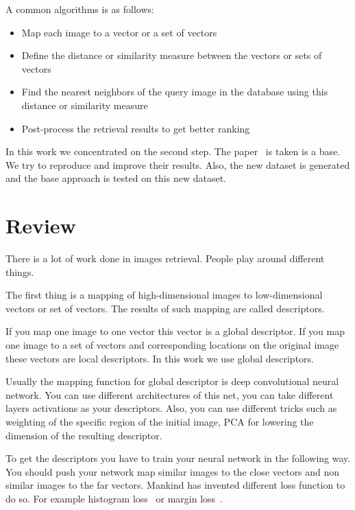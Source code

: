 \documentclass[a4paper,12pt]{extreport}
\begin{document}
    A common algorithms is as follows:
    \begin{itemize}
        \item {Map each image to a vector or a set of vectors}
        \item {Define the distance or similarity measure between the vectors or sets of vectors}
        \item {Find the nearest neighbors of the query image in the database using this distance or similarity measure}
        \item {Post-process the retrieval results to get better ranking}
    \end{itemize}

    In this work we concentrated on the second step. The paper~\cite{original_paper} is taken is a base.
    We try to reproduce and improve their results.
    Also, the new dataset is generated and the base approach is tested on this new dataset.
    \newline

    \chapter{Review}\label{ch:review}

    There is a lot of work done in images retrieval. People play around different things.
    \newline

    The first thing is a mapping of high-dimensional images to low-dimensional vectors or set of vectors.
    The results of such mapping are called descriptors.

    If you map one image to one vector this vector is a global descriptor.
    If you map one image to a set of vectors and corresponding locations on the original image these vectors are local descriptors.
    In this work we use global descriptors.

    Usually the mapping function for global descriptor is deep convolutional neural network.
    You can use different architectures of this net, you can take different layers activations as your descriptors.
    Also, you can use different tricks such as weighting of the specific region of the initial image, PCA for lowering the
    dimension of the resulting descriptor.

    To get the descriptors you have to train your neural network in the following way.
    You should push your network map similar images to the close vectors and non similar images to the far vectors.
    Mankind has invented different loss function to do so.
    For example histogram loss~\cite{hist}  or margin loss~\cite{margin}.
\end{document}

